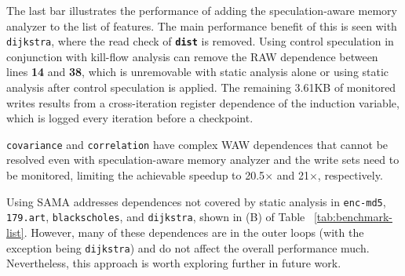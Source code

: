 The last bar illustrates the performance of adding the speculation-aware
memory analyzer to the list of features. The main performance benefit of
this is seen with \texttt{dijkstra}, where the read check of
\texttt{\textbf{dist}} is removed. Using control speculation in conjunction
with kill-flow analysis can remove the RAW dependence between lines
\textbf{14} and \textbf{38}, which is unremovable with static analysis
alone or using static analysis after control speculation is applied.
The remaining 3.61KB of monitored writes results from a cross-iteration
register dependence of the induction variable, which is logged every
iteration before a checkpoint.

\texttt{covariance} and \texttt{correlation} have complex WAW dependences
that cannot be resolved even with speculation-aware memory analyzer and
the write sets need to be monitored, limiting the achievable speedup to
20.5$\times$ and 21$\times$, respectively.



Using SAMA addresses dependences not covered by static analysis in
\texttt{enc-md5}, \texttt{179.art}, \texttt{blackscholes}, and
\texttt{dijkstra}, shown in (B) of Table ~\ref{tab:benchmark-list}. However,
many of these dependences are in the outer loops (with the exception
being \texttt{dijkstra}) and do not affect the overall performance much.
Nevertheless, this approach is worth exploring further in future work.




